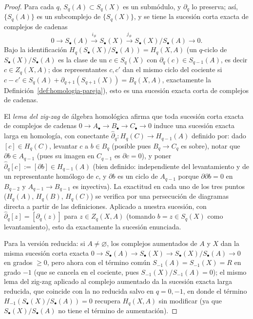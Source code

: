 \documentclass[11pt,a4paper]{article}
\theoremstyle{plain}
\theoremstyle{definition}
\theoremstyle{remark}
\begin{document}
\begin{proof}
Para cada $q$, $S_q(A)\subset S_q(X)$ es un submódulo, y $\partial_q$ lo
preserva; así, $\{S_q(A)\}$ es un subcomplejo de $\{S_q(X)\}$, y se tiene
la sucesión corta exacta de complejos de cadenas
\[
0\to S_\bullet(A)\xrightarrow{i_\#}S_\bullet(X)\xrightarrow{j_\#}S_\bullet(X)/S_\bullet(A)\to0.
\]
Bajo la identificación $H_q(S_\bullet(X)/S_\bullet(A))=H_q(X,A)$ (un
$q$-ciclo de $S_\bullet(X)/S_\bullet(A)$ es la clase de un
$c\in S_q(X)$ con $\partial_q(c)\in S_{q-1}(A)$, es decir $c\in Z_q(X,A)$;
dos representantes $c,c'$ dan el mismo ciclo del cociente si
$c-c'\in S_q(A)+\partial_{q+1}(S_{q+1}(X))=B_q(X,A)$, exactamente la
Definición~\ref{def:homologia-pareja}), esto es una sucesión exacta corta
de complejos de cadenas.

El \emph{lema del zig-zag} de álgebra homológica afirma que toda sucesión
corta exacta de complejos de cadenas $0\to A_\bullet\to B_\bullet\to C_\bullet\to0$
induce una sucesión exacta larga en homología, con conectante
$\hat\partial_q:H_q(C)\to H_{q-1}(A)$ definido por: dado $[c]\in H_q(C)$,
levantar $c$ a $b\in B_q$ (posible pues $B_q\to C_q$ es sobre), notar que
$\partial b\in A_{q-1}$ (pues su imagen en $C_{q-1}$ es $\partial c=0$), y
poner $\hat\partial_q[c]:=[\partial b]\in H_{q-1}(A)$ (bien definido:
independiente del levantamiento y de un representante homólogo de $c$, y
$\partial b$ es un ciclo de $A_{q-1}$ porque $\partial\partial b=0$ en
$B_{q-2}$ y $A_{q-1}\to B_{q-1}$ es inyectiva). La exactitud en cada uno de
los tres puntos ($H_q(A)$, $H_q(B)$, $H_q(C)$) se verifica por una
persecución de diagramas directa a partir de las definiciones. Aplicado a
nuestra sucesión, con $\hat\partial_q[z]=[\partial_q(z)]$ para
$z\in Z_q(X,A)$ (tomando $b=z\in S_q(X)$ como levantamiento), esto da
exactamente la sucesión enunciada.

Para la versión reducida: si $A\ne\varnothing$, los complejos aumentados
de $A$ y $X$ dan la misma sucesión corta exacta
$0\to S_\bullet(A)\to S_\bullet(X)\to S_\bullet(X)/S_\bullet(A)\to0$ en
grados $\ge0$, pero ahora con el término común $S_{-1}(A)=S_{-1}(X)=R$ en
grado $-1$ (que se cancela en el cociente, pues
$S_{-1}(X)/S_{-1}(A)=0$); el mismo lema del zig-zag aplicado al complejo
aumentado da la sucesión exacta larga reducida, que coincide con la no
reducida salvo en $q=0,-1$, en donde el término $H_{-1}(S_\bullet(X)/S_\bullet(A))=0$
recupera $H_q(X,A)$ sin modificar (ya que $S_\bullet(X)/S_\bullet(A)$ no
tiene el término de aumentación).
\end{proof}
\end{document}
